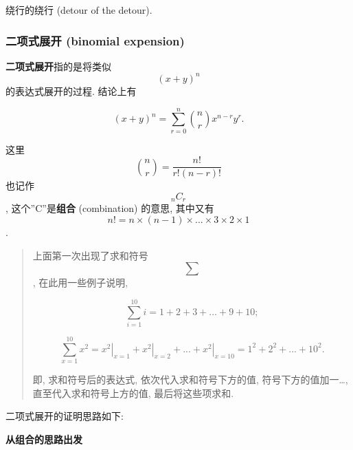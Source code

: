 绕行的绕行 (detour of the detour).

\hypertarget{ux4e8cux9879ux5f0fux5c55ux5f00-binomial-expension}{%
\subsubsection{二项式展开 (binomial
expension)}\label{ux4e8cux9879ux5f0fux5c55ux5f00-binomial-expension}}

\textbf{二项式展开}指的是将类似 \[(x+y)^n\] 的表达式展开的过程. 结论上有

\[\boxed{(x+y)^n=\sum_{r=0}^n\binom{n}{r}x^{n-r}y^r}.\]

这里 \[\binom{n}{r}=\frac{n!}{r!(n-r)!}\] 也记作 \[_nC_r\],
这个''C''是\textbf{组合} (combination) 的意思, 其中又有
\[n!=n\times(n-1)\times...\times3\times2\times1\].

\begin{quote}
上面第一次出现了求和符号 \[\sum\], 在此用一些例子说明,

\[\sum_{i=1}^{10}i=1+2+3+...+9+10;\]

\[\sum_{x=1}^{10}x^2=\left.x^2\right|_{x=1}+\left.x^2\right|_{x=2}+...+\left.x^2\right|_{x=10}=1^2+2^2+...+10^2.\]

即, 求和符号后的表达式, 依次代入求和符号下方的值,
符号下方的值加一\ldots, 直至代入求和符号上方的值, 最后将这些项求和.
\end{quote}

二项式展开的证明思路如下:

\textbf{从组合的思路出发}

